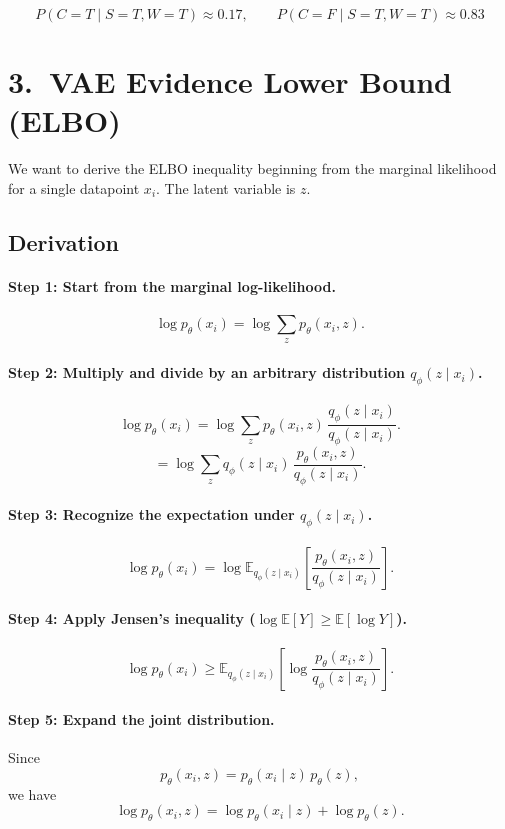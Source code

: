 \documentclass{article}
\begin{document}
\[
\boxed{
P(C=T\mid S=T,W=T) \approx 0.17,\qquad
P(C=F\mid S=T,W=T) \approx 0.83
}
\]

\section*{3.\ VAE Evidence Lower Bound (ELBO)}

We want to derive the ELBO inequality beginning from the marginal likelihood
for a single datapoint \(x_i\). The latent variable is \(z\).

\subsection*{Derivation}

\paragraph{Step 1: Start from the marginal log-likelihood.}
\[
\log p_\theta(x_i)
= \log \sum_{z} p_\theta(x_i, z).
\]

\paragraph{Step 2: Multiply and divide by an arbitrary distribution \(q_\phi(z\mid x_i)\).}
\[
\log p_\theta(x_i)
= \log \sum_{z} p_\theta(x_i, z)\,
     \frac{q_\phi(z\mid x_i)}{q_\phi(z\mid x_i)}.
\]
\[
= \log \sum_{z} q_\phi(z\mid x_i)\,
       \frac{p_\theta(x_i, z)}{q_\phi(z\mid x_i)}.
\]

\paragraph{Step 3: Recognize the expectation under \(q_\phi(z\mid x_i)\).}
\[
\log p_\theta(x_i)
= \log \mathbb{E}_{q_\phi(z\mid x_i)}
  \left[
    \frac{p_\theta(x_i, z)}{q_\phi(z\mid x_i)}
  \right].
\]

\paragraph{Step 4: Apply Jensen’s inequality (\(\log \mathbb{E}[Y] \ge \mathbb{E}[\log Y]\)).}
\[
\log p_\theta(x_i)
\ge 
\mathbb{E}_{q_\phi(z\mid x_i)}
\left[
  \log \frac{p_\theta(x_i, z)}{q_\phi(z\mid x_i)}
\right].
\]

\paragraph{Step 5: Expand the joint distribution.}
Since
\[
p_\theta(x_i,z) = p_\theta(x_i\mid z)\,p_\theta(z),
\]
we have
\[
\log p_\theta(x_i, z)
= \log p_\theta(x_i\mid z) + \log p_\theta(z).
\]
\end{document}
